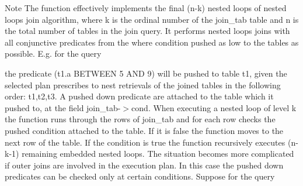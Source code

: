 \begin{DoxyNote}{Note}
The function effectively implements the final (n-\/k) nested loops of nested loops join algorithm, where k is the ordinal number of the join\+\_\+tab table and n is the total number of tables in the join query. It performs nested loops joins with all conjunctive predicates from the where condition pushed as low to the tables as possible. E.\+g. for the query 
\begin{DoxyCode}{0}
\end{DoxyCode}
 the predicate (t1.\+a B\+E\+T\+W\+E\+EN 5 A\+ND 9) will be pushed to table t1, given the selected plan prescribes to nest retrievals of the joined tables in the following order\+: t1,t2,t3. A pushed down predicate are attached to the table which it pushed to, at the field join\+\_\+tab-\/$>$cond. When executing a nested loop of level k the function runs through the rows of \textquotesingle{}join\+\_\+tab\textquotesingle{} and for each row checks the pushed condition attached to the table. If it is false the function moves to the next row of the table. If the condition is true the function recursively executes (n-\/k-\/1) remaining embedded nested loops. The situation becomes more complicated if outer joins are involved in the execution plan. In this case the pushed down predicates can be checked only at certain conditions. Suppose for the query 
\begin{DoxyCode}{0}
\end{DoxyCode}

\end{DoxyNote}
